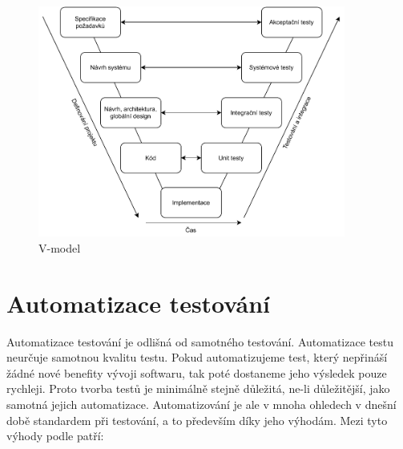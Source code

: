 \begin{figure}[htbp]
    \centering 
    \includegraphics[width=0.9\textwidth]{assets/img/vmodel.pdf}
    \caption{V-model}
    \label{fig:vmodel}
\end{figure}


\section{Automatizace testování}

Automatizace testování je odlišná od samotného testování. Automatizace testu neurčuje samotnou kvalitu testu. Pokud automatizujeme test, který nepřináší žádné nové benefity vývoji softwaru, tak poté dostaneme jeho výsledek pouze rychleji. \cite{fewster1999software} Proto tvorba testů je minimálně stejně důležitá, ne-li důležitější, jako samotná jejich automatizace. Automatizování je ale v mnoha ohledech v dnešní době standardem při testování, a to především díky jeho výhodám. Mezi tyto výhody podle \cite{fewster1999software} patří:

